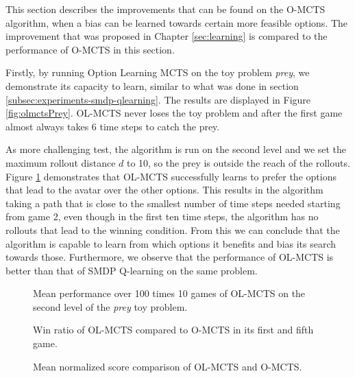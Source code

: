 This section describes the improvements that can be found on the O-MCTS
algorithm, when a bias can be learned towards certain more feasible options. The
improvement that was proposed in Chapter \ref{sec:learning} is compared to
the performance of O-MCTS in this section.

Firstly, by running Option Learning MCTS on the toy problem \textit{prey}, we
demonstrate its capacity to learn, similar to what was done in section
\ref{subsec:experiments-smdp-qlearning}. The results are displayed in Figure
\ref{fig:olmctsPrey}. OL-MCTS never loses the toy problem and after the first
game almost always takes 6 time steps to catch the prey. 

As more challenging test, the algorithm is run on the second level and we set
the maximum rollout distance $d$ to 10, so the prey is outside the reach of the
rollouts. Figure \ref{fig:olmctsPrey3} demonstrates that OL-MCTS successfully
learns to prefer the options that lead to the avatar over the other options.
This results in the algorithm taking a path that is close to the smallest number
of time steps needed starting from game 2, even though in the first ten time
steps, the algorithm has no rollouts that lead to the winning condition. From
this we can conclude that the algorithm is capable to learn from which options
it benefits and bias its search towards those. Furthermore, we observe that the
performance of OL-MCTS is better than that of SMDP Q-learning on the same
problem.

\begin{figure}
	\centering
	\caption{Mean performance over 100 times 10 games of OL-MCTS on the second
		level of the \textit{prey} toy problem.}
	\label{fig:olmctsPrey3}
\end{figure}


\begin{figure}
	\centering
	\vspace{-.8cm}
	\caption{Win ratio of OL-MCTS compared to O-MCTS in its first and fifth game.}
	\label{fig:wins-olmcts}
	\centering
	\vspace{-.8cm}
	\caption{Mean normalized score comparison of OL-MCTS and O-MCTS.}
	\label{fig:scores-olmcts}
\end{figure}

